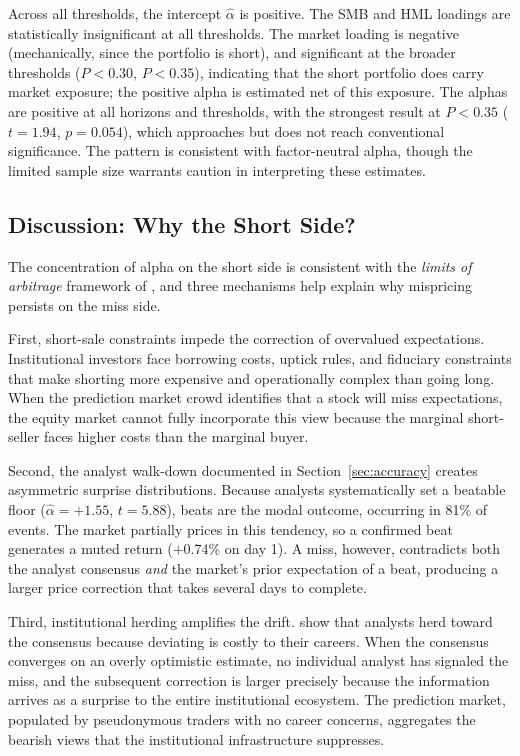 \documentclass[11pt]{article}
\begin{document}
Across all thresholds, the intercept $\hat{\alpha}$ is positive. The SMB and HML loadings are statistically insignificant at all thresholds. The market loading is negative (mechanically, since the portfolio is short), and significant at the broader thresholds ($P < 0.30$, $P < 0.35$), indicating that the short portfolio does carry market exposure; the positive alpha is estimated net of this exposure. The alphas are positive at all horizons and thresholds, with the strongest result at $P < 0.35$ ($t = 1.94$, $p = 0.054$), which approaches but does not reach conventional significance. The pattern is consistent with factor-neutral alpha, though the limited sample size warrants caution in interpreting these estimates.

\subsection{Discussion: Why the Short Side?}

The concentration of alpha on the short side is consistent with the \textit{limits of arbitrage} framework of \citet{shleifer1997limits}, and three mechanisms help explain why mispricing persists on the miss side.

First, short-sale constraints impede the correction of overvalued expectations. Institutional investors face borrowing costs, uptick rules, and fiduciary constraints that make shorting more expensive and operationally complex than going long. When the prediction market crowd identifies that a stock will miss expectations, the equity market cannot fully incorporate this view because the marginal short-seller faces higher costs than the marginal buyer.

Second, the analyst walk-down documented in Section~\ref{sec:accuracy} creates asymmetric surprise distributions. Because analysts systematically set a beatable floor ($\hat{\alpha} = +1.55$, $t = 5.88$), beats are the modal outcome, occurring in 81\% of events. The market partially prices in this tendency, so a confirmed beat generates a muted return ($+$0.74\% on day 1). A miss, however, contradicts both the analyst consensus \textit{and} the market's prior expectation of a beat, producing a larger price correction that takes several days to complete.

Third, institutional herding amplifies the drift. \citet{hong2000security} show that analysts herd toward the consensus because deviating is costly to their careers. When the consensus converges on an overly optimistic estimate, no individual analyst has signaled the miss, and the subsequent correction is larger precisely because the information arrives as a surprise to the entire institutional ecosystem. The prediction market, populated by pseudonymous traders with no career concerns, aggregates the bearish views that the institutional infrastructure suppresses.
\end{document}
